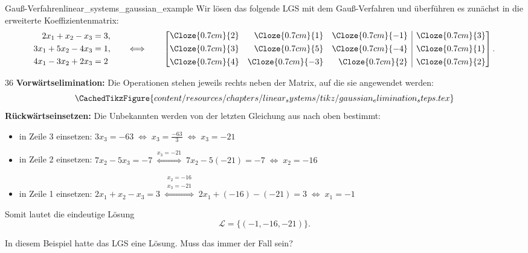 \noindent\begin{minipage}{\linewidth}
\begin{ExampleBox}{Gauß-Verfahren}{linear_systems_gaussian_example}
  Wir lösen das folgende LGS mit dem Gauß-Verfahren und überführen es zunächst
  in die erweiterte Koeffizientenmatrix:
    \[
      \begin{aligned}
        2x_1+x_2-x_3&=3,\\
        3x_1+5x_2-4x_3&=1,\\
        4x_1-3x_2+2x_3&=2
      \end{aligned}
      \qquad\Longleftrightarrow\qquad
      \left[
        \begin{array}{@{}rrr|r@{}}
          \Cloze{0.7cm}{2}&\Cloze{0.7cm}{1}&\Cloze{0.7cm}{-1}&\Cloze{0.7cm}{3}\\[0.35em]
          \Cloze{0.7cm}{3}&\Cloze{0.7cm}{5}&\Cloze{0.7cm}{-4}&\Cloze{0.7cm}{1}\\[0.35em]
          \Cloze{0.7cm}{4}&\Cloze{0.7cm}{-3}&\Cloze{0.7cm}{2}&\Cloze{0.7cm}{2}
        \end{array}
      \right].
    \]
  \begin{ClozeArea}[34]{36}
    \textbf{Vorwärtselimination:} Die Operationen stehen jeweils rechts neben
    der Matrix, auf die sie angewendet werden:
    \[
      \CachedTikzFigure{content/resources/chapters/linear_systems/tikz/gaussian_elimination_steps.tex}
    \]
    \textbf{Rückwärtseinsetzen:} Die Unbekannten werden von der letzten
    Gleichung aus nach oben bestimmt:
    \begin{itemize}[leftmargin=1.4em,itemsep=0.55em,topsep=0.3em]
      \item in Zeile 3 einsetzen:\qquad
        \(
          3x_3=-63
          \;\Longleftrightarrow\;
          x_3=\frac{-63}{3}
          \;\Longleftrightarrow\;
          x_3=-21
        \)
      \item in Zeile 2 einsetzen: \qquad
        \(
          7x_2-5x_3=-7
          \;\overset{x_3=-21}{\Longleftrightarrow}\;
          7x_2-5(-21)=-7
          \;\Longleftrightarrow\;
          x_2=-16
        \)
      \item in Zeile 1 einsetzen: \qquad
        \(
          2x_1+x_2-x_3=3
          \;\overset{\substack{x_2=-16\\x_3=-21}}{\Longleftrightarrow}\;
          2x_1+(-16)-(-21)=3
          \;\Longleftrightarrow\;
          x_1=-1
        \)
    \end{itemize}
    Somit lautet die eindeutige Lösung
    \[
      \mathcal{L}=\{(-1,-16,-21)\}.
    \]
  \end{ClozeArea}
\end{ExampleBox}

In diesem Beispiel hatte das LGS eine Lösung. Muss das immer der Fall sein?
\end{minipage}
